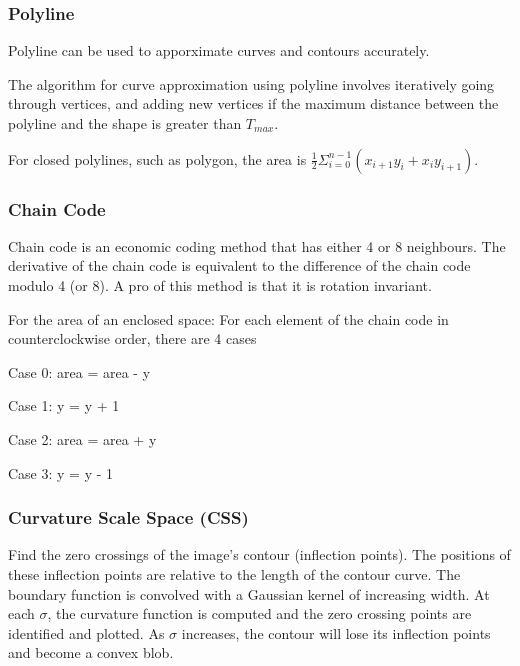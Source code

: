 \documentclass{article}
\begin{document}
\begin{multicols}{2}
 \subsubsection{Polyline}

  Polyline can be used to apporximate curves and contours accurately.
  
  The algorithm for curve approximation using polyline involves iteratively going through vertices, and adding new vertices if the maximum distance between the polyline and the shape is greater than $T_{max}$.

  For closed polylines, such as polygon, the area is $\frac{1}{2}\Sigma_{i=0}^{n-1}(x_{i+1}y_i + x_iy_{i+1})$.

 \subsubsection{Chain Code}

  Chain code is an economic coding method that has either 4 or 8 neighbours.
  The derivative of the chain code is equivalent to the difference of the chain code modulo 4 (or 8).
  A pro of this method is that it is rotation invariant.

  For the area of an enclosed space:
  For each element of the chain code in counterclockwise order, there are 4 cases
  
  \vspace{2mm}
  
  Case 0: area = area - y

  \vspace{2mm}

  Case 1: y = y + 1

  \vspace{2mm}

  Case 2: area = area + y

  \vspace{2mm}

  Case 3: y = y - 1

 \subsubsection{Curvature Scale Space (CSS)}

  Find the zero crossings of the image's contour (inflection points).
  The positions of these inflection points are relative to the length of the contour curve.
  The boundary function is convolved with a Gaussian kernel of increasing width.
  At each $\sigma$, the curvature function is computed and the zero crossing points are identified and plotted.
  As $\sigma$ increases, the contour will lose its inflection points and become a convex blob.
  

\end{multicols}
\end{document}

